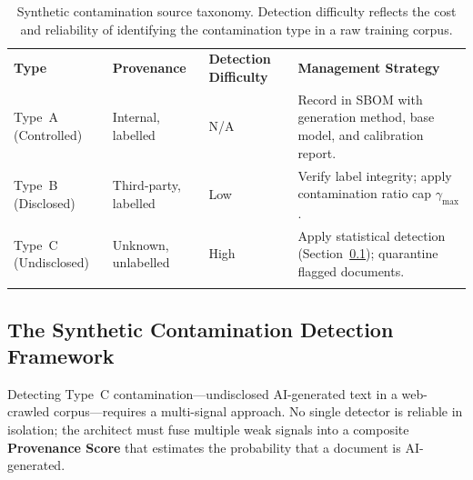 \begin{table}[ht]
\centering
\caption{Synthetic contamination source taxonomy.
  Detection difficulty reflects the cost and reliability of
  identifying the contamination type in a raw training corpus.}
\label{tab:contamination-sources}
\small
\begin{tabular}{p{2.0cm}p{2.2cm}p{2.0cm}p{5.0cm}}
\hline\noalign{\smallskip}
\textbf{Type}
  & \textbf{Provenance}
  & \textbf{Detection Difficulty}
  & \textbf{Management Strategy} \\
\noalign{\smallskip}\svhline\noalign{\smallskip}

Type~A (Controlled)
  & Internal, labelled
  & N/A
  & Record in SBOM with generation method,
    base model, and calibration report. \\[4pt]

Type~B (Disclosed)
  & Third-party, labelled
  & Low
  & Verify label integrity; apply contamination
    ratio cap $\gamma_{\max}$. \\[4pt]

Type~C (Undisclosed)
  & Unknown, unlabelled
  & High
  & Apply statistical detection (Section~\ref{subsec:detection-framework});
    quarantine flagged documents. \\

\noalign{\smallskip}\hline\noalign{\smallskip}
\end{tabular}
\end{table}

\subsection{The Synthetic Contamination Detection Framework}
\label{subsec:detection-framework}

Detecting Type~C contamination---undisclosed AI-generated text
in a web-crawled corpus---requires a multi-signal approach.
No single detector is reliable in isolation; the architect
must fuse multiple weak signals into a composite
\textbf{Provenance Score} that estimates the probability that
a document is AI-generated.

